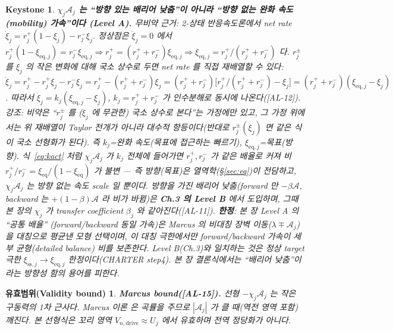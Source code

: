 \documentclass[11pt,a4paper]{article}
\newtheorem*{boundbox}{유효범위(Validity bound)}
\newtheorem*{keybox}{Keystone}
\newcommand{\eq}{\mathrm{eq}}
\newcommand{\drive}{\mathrm{drive}}
\newcommand{\AL}[1]{\textsf{[AL-#1]}}
\begin{document}
\begin{keybox}
\textbf{$\chi_j\mathcal A_j$ 는 ``방향 있는 배리어 낮춤''이 아니라 ``방향 없는 완화 속도(mobility) 가속''이다
(Level A).} 무비약 근거: 2-상태 반응속도론에서 net rate $\dot\xi_j=r_j^+(1-\xi_j)-r_j^-\xi_j$. 정상점은
$\dot\xi_j=0$ 에서 $r_j^+(1-\xi_{\eq,j})=r_j^-\xi_{\eq,j}\Rightarrow r_j^+=(r_j^++r_j^-)\xi_{\eq,j}
\Rightarrow\xi_{\eq,j}=r_j^+/(r_j^++r_j^-)$ 다. $r_j^\pm$ 를 $\xi_j$ 의 작은 변화에 대해 국소 상수로 두면
net rate 를 직접 재배열할 수 있다: $\dot\xi_j=r_j^+-r_j^+\xi_j-r_j^-\xi_j=r_j^+-(r_j^++r_j^-)\xi_j
=(r_j^++r_j^-)\big[r_j^+/(r_j^++r_j^-)-\xi_j\big]=(r_j^++r_j^-)(\xi_{\eq,j}-\xi_j)$. 따라서
$\dot\xi_j=k_j(\xi_{\eq,j}-\xi_j)$, $k_j=r_j^++r_j^-$ 가 인수분해로 동시에 나온다(\AL{12}). \emph{강조}: 비약은
``$r_j^\pm$ 를 ($\xi_j$ 에 무관한) 국소 상수로 본다''는 \emph{가정}에만 있고, 그 가정 위에서는 위 재배열이 Taylor
전개가 아니라 대수적 항등이다(반대로 $r_j^\pm(\xi_j)$ 면 같은 식이 국소 선형화가 된다). 즉 $k_j$=완화 속도(목표에 접근하는 빠르기),
$\xi_{\eq,j}$=목표(방향). 식~\eqref{eq:kact} 처럼 $\chi_j\mathcal A_j$ 가 \emph{$k_j$
전체}에 들어가면 $r_j^+,r_j^-$ 가 같은 배율로 커져 비 $r_j^+/r_j^-=\xi_\eq/(1-\xi_\eq)$ 가 \emph{불변}
— 즉 방향(목표)은 열역학(\S\ref{sec:eq})이 전담하고, $\chi_j\mathcal A_j$ 는 방향 없는 속도 scale 일 뿐이다.
\emph{방향을 가진} 배리어 낮춤(forward 만 $-\beta\mathcal A$,
backward 는 $+(1-\beta)\mathcal A$ 라 비가 바뀜)은 \textbf{Ch.3 의 Level B} 에서 도입하며, 그때 본 장의
$\chi_j$ 가 transfer coefficient $\beta_j$ 와 같아진다(\AL{11}). \textbf{한정}: 본 장 Level A 의 ``공통 배율''
(forward/backward 동일 가속)은 Marcus 의 \emph{비대칭} 장벽 이동($\lambda\mp\mathcal A_j$)을 대칭으로 평균낸
\emph{모형 선택}이며, 이 대칭 극한에서만 forward/backward 가속이 세부 균형(detailed balance) 비를 보존한다. Level B(Ch.3)와
일치하는 것은 \emph{정상 target 극한} $\xi_{\mathrm{ss},j}\to\xi_{\eq,j}$ 한정이다(CHARTER step4). 본 장
결론식에서는 ``배리어 낮춤''이라는 방향성 함의 용어를 피한다.
\end{keybox}
\begin{boundbox}
\textbf{Marcus bound(\AL{15}).} 선형 $-\chi_j\mathcal A_j$ 는 작은 구동력의 1차 근사다. Marcus 이론
\cite{marcus1956} 은 곡률을 주므로 $|\mathcal A_j|$ 가 클 때(역전 영역 포함) 깨진다. 본 선형식은 꼬리 영역
$V_{n,\drive}\approx U_j$ 에서 유효하며 전역 정당화가 아니다.
\end{boundbox}
\end{document}
